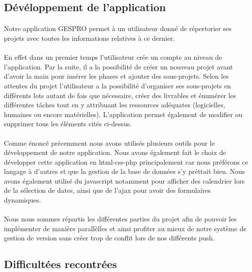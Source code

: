 \documentclass[a4paper, 12pt]{article}
\begin{document}
\subsection{Dévéloppement de l'application}
\paragraph{}Notre application GESPRO permet à un utilisateur donné de répertorier ses projets avec toutes les informations relatives à ce dernier.
\paragraph{}En effet dans un premier temps l’utilisateur crée un compte au niveau de l’application. Par la suite, il a la possibilité de créer un nouveau projet avant d’avoir la main pour insérer les phases et ajouter des sous-projets. Selon les attentes du projet l’utilisateur a la possibilité d’organiser ses sous-projets en différents lots autant de fois que nécessaire,  créer des livrables et énumérer les différentes tâches tout en y attribuant les ressources adéquates (logicielles, humaines ou encore matérielles). L’application permet également de modifier ou supprimer tous les éléments cités ci-dessus. 

\paragraph{}Comme énoncé précemment nous avons utilisés plusieurs outils pour le développement de notre application. Nous avons également fait le choix de développer cette application en html-css-php principalement car nous préférons ce langage à d'autres et que la gestion de la base de données s'y préttait bien. Nous avons également utilisé du javascript notamment pour afficher des calendrier lors de la sélection de dates, ainsi que de l'ajax pour avoir des formulaires dynamiques.
\paragraph{}Nous nous sommes répartis les différentes parties du projet afin de pouvoir les implémenter de manière parallèlles et ainsi profiter au mieux de notre système de gestion de version sans créer trop de conflit lors de nos différents push.

\newpage
\subsection{Difficultées recontrées}
\end{document}
